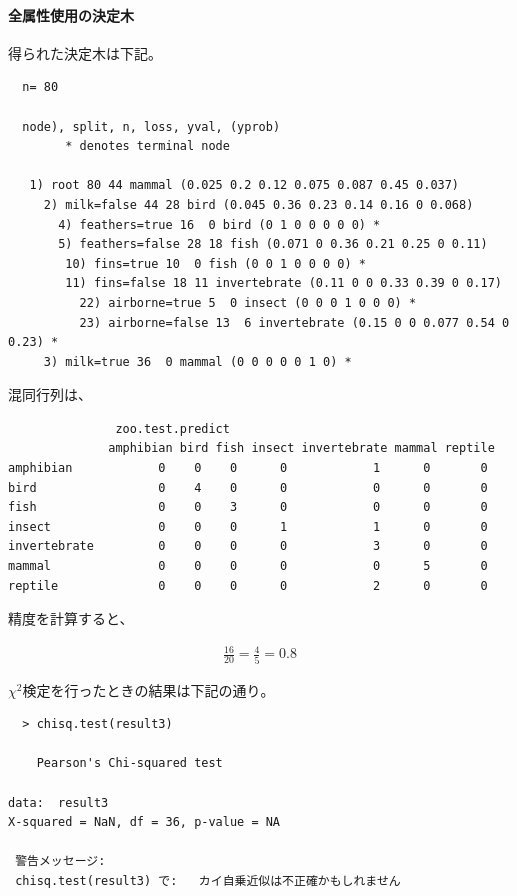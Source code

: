 \documentclass[dvipdfmx]{jsarticle}
\begin{document}
\paragraph{全属性使用の決定木}
得られた決定木は下記。
\begin{verbatim}
  n= 80

  node), split, n, loss, yval, (yprob)
        * denotes terminal node

   1) root 80 44 mammal (0.025 0.2 0.12 0.075 0.087 0.45 0.037)
     2) milk=false 44 28 bird (0.045 0.36 0.23 0.14 0.16 0 0.068)
       4) feathers=true 16  0 bird (0 1 0 0 0 0 0) *
       5) feathers=false 28 18 fish (0.071 0 0.36 0.21 0.25 0 0.11)
        10) fins=true 10  0 fish (0 0 1 0 0 0 0) *
        11) fins=false 18 11 invertebrate (0.11 0 0 0.33 0.39 0 0.17)
          22) airborne=true 5  0 insect (0 0 0 1 0 0 0) *
          23) airborne=false 13  6 invertebrate (0.15 0 0 0.077 0.54 0 0.23) *
     3) milk=true 36  0 mammal (0 0 0 0 0 1 0) *

\end{verbatim}
混同行列は、
\begin{verbatim}
               zoo.test.predict
              amphibian bird fish insect invertebrate mammal reptile
amphibian            0    0    0      0            1      0       0
bird                 0    4    0      0            0      0       0
fish                 0    0    3      0            0      0       0
insect               0    0    0      1            1      0       0
invertebrate         0    0    0      0            3      0       0
mammal               0    0    0      0            0      5       0
reptile              0    0    0      0            2      0       0
\end{verbatim}
精度を計算すると、
\begin{center}
  \begin{align*}
    \frac{16}{20} = \frac{4}{5} = 0.8
  \end{align*}
\end{center}
$χ^{2}検定を行ったときの結果は下記の通り。$
\begin{verbatim}
  > chisq.test(result3)

	Pearson's Chi-squared test

data:  result3
X-squared = NaN, df = 36, p-value = NA

 警告メッセージ:
 chisq.test(result3) で:   カイ自乗近似は不正確かもしれません
\end{verbatim}
\end{document}
